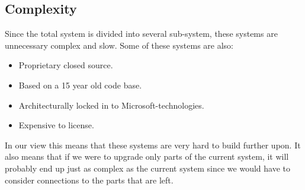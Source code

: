 \subsection{Complexity}Since the total system is divided into several sub-system, these systems are unnecessary complex and slow. Some of these systems are also:
\begin{itemize}
\item Proprietary closed source.
\item Based on a 15 year old code base.
\item Architecturally locked in to Microsoft-technologies.
\item Expensive to license.
\end{itemize}
In our view this means that these systems are very hard to build further upon. It also means that if we were to upgrade only parts of the current system, it will probably end up just as complex as the current system since we would have to consider connections to the parts that are left.

